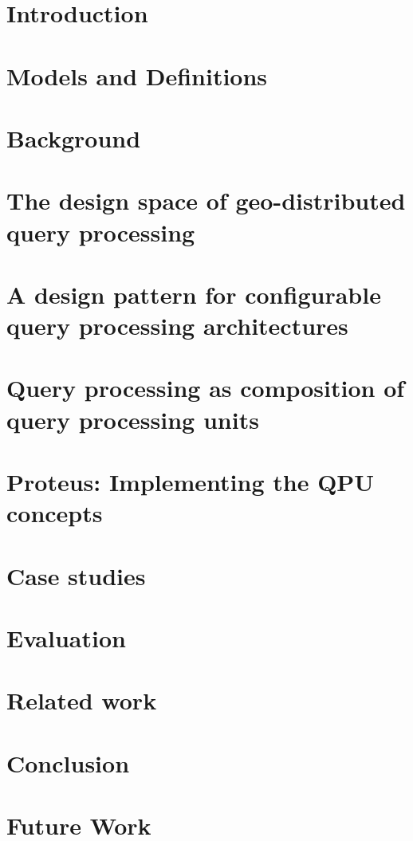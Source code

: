 \chapter{Introduction}
\label{ch:intro}


\chapter{Models and Definitions}
\label{ch:models}


\chapter{Background}
\label{ch:background}


\chapter{The design space of geo-distributed query processing}
\label{ch:design_space}


\chapter{A design pattern for configurable query processing architectures}
\label{ch:design_pattern}


\chapter{Query processing as composition of query processing units}
\label{ch:composition}


\chapter{Proteus: Implementing the QPU concepts}
\label{ch:proteus}


\chapter{Case studies}
\label{ch:case_studies}


\chapter{Evaluation}
\label{ch:evaluation}


\chapter{Related work}
\label{ch:related_work}


\chapter{Conclusion}
\label{ch:conclusion}


\chapter{Future Work}
\label{ch:future_work}

